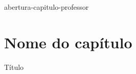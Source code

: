 \renewcommand\chapterillustration{abertura-capitulo}{abertura-capitulo-professor}

\chapterwhat{}

\chapterbecause{}

\chapter{Nome do capítulo}


\autorum{}
\autordois{}

\revisorum{}

\versao{}

\graficos{}
\ilustracao{}


\creditos


\mainmatter



\begin{apresentacao}{Título}


\end{apresentacao}

\def\currentcolor{session1}

\begin{objectives}{}
{

}{}{}
\end{objectives}

\begin{sugestions}{}
{

}{}{}
\end{sugestions}

\begin{answer}{}
{

}{}
\end{answer}




\explore{}

